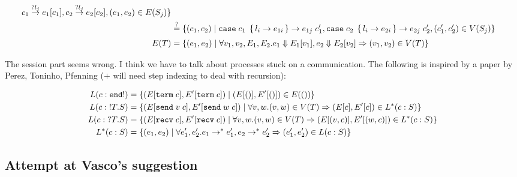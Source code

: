 \begin{align*}
                         c_1 \stackrel{?l_j}{\to} e_1[c_1],
                c_2 \stackrel{?l_j}{\to} e_2[c_2],
                         (e_1, e_2) \in E(S_j) \}
  \\&\stackrel{?}{=}
  \{ (c_1, c_2) \mid
  \mathtt{case}\; c_1 \; \left\{\, l_i \to e_{1i} \,\right\} \stackrel{}\rightarrow e_{1j}\; c_1', 
  \mathtt{case}\; c_2 \; \left\{\, l_i \to e_{2i} \,\right\} \stackrel{}\rightarrow e_{2j}\; c_2',
  (c_1', c_2') \in V (S_j)
  \}
  \\
  E (T) &= \{ (e_1, e_2) \mid \forall v_1, v_2, E_1, E_2. e_1 \stackrel{}\Downarrow E_1[v_1], e_2 \stackrel{}\Downarrow  E_2[v_2] \Rightarrow (v_1, v_2)\in V (T) \}
\end{align*}

The session part seems wrong. I think we have to talk about processes stuck on a communication.
The following is inspired by a paper by Perez, Toninho, Pfenning ($+$ will need step indexing to deal with recursion): 

\begin{align*}
  L (c : \mathtt{end !}) &= \{ (E[ \mathtt{term}\; c ], E'[ \mathtt{term}\; c ]) \mid (E[()], E'[()]) \in E (())
                   \}
  \\
  L (c : {}!T.S) &= \{ (E[ \mathtt{send}\; v \; c ], E'[ \mathtt{send}\; w \; c ]) \mid \forall v, w. (v, w) \in V (T) \Rightarrow (E[c], E'[c]) \in L^* (c : S) \}
  \\
  L (c : {}?T.S) &= \{ (E[ \mathtt{recv}\; c ], E'[ \mathtt{recv}\; c ]) \mid \forall v, w. (v, w) \in V (T) \Rightarrow (E[(v,c)], E'[(w,c)]) \in L^* (c : S) \}
  \\
  L^* (c : S) &= \{ (e_1, e_2) \mid \forall e_1', e_2'. e_1 \to^* e_1', e_2 \to^* e_2' \Rightarrow (e_1', e_2') \in L (c : S) \}
\end{align*}

\subsection{Attempt at Vasco's suggestion}
\label{sec:attempt-at-vascos}

